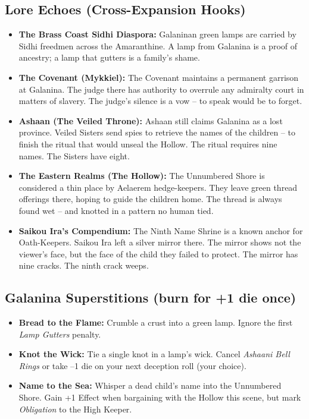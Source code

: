 \subsection*{Lore Echoes (Cross-Expansion Hooks)}
\begin{itemize}
  \item \textbf{The Brass Coast Sidhi Diaspora:} Galaninan green lamps are carried by Sidhi freedmen across the Amaranthine. A lamp from Galanina is a proof of ancestry; a lamp that gutters is a family's shame.
  \item \textbf{The Covenant (Mykkiel):} The Covenant maintains a permanent garrison at Galanina. The judge there has authority to overrule any admiralty court in matters of slavery. The judge's silence is a vow -- to speak would be to forget.
  \item \textbf{Ashaan (The Veiled Throne):} Ashaan still claims Galanina as a lost province. Veiled Sisters send spies to retrieve the names of the children -- to finish the ritual that would unseal the Hollow. The ritual requires nine names. The Sisters have eight.
  \item \textbf{The Eastern Realms (The Hollow):} The Unnumbered Shore is considered a thin place by Aelaerem hedge-keepers. They leave green thread offerings there, hoping to guide the children home. The thread is always found wet -- and knotted in a pattern no human tied.
  \item \textbf{Saikou Ira's Compendium:} The Ninth Name Shrine is a known anchor for Oath-Keepers. Saikou Ira left a silver mirror there. The mirror shows not the viewer's face, but the face of the child they failed to protect. The mirror has nine cracks. The ninth crack weeps.
\end{itemize}

\subsection*{Galanina Superstitions (burn for +1 die once)}
\begin{itemize}
  \item \textbf{Bread to the Flame:} Crumble a crust into a green lamp. Ignore the first \textit{Lamp Gutters} penalty.
  \item \textbf{Knot the Wick:} Tie a single knot in a lamp's wick. Cancel \textit{Ashaani Bell Rings} or take --1 die on your next deception roll (your choice).
  \item \textbf{Name to the Sea:} Whisper a dead child's name into the Unnumbered Shore. Gain +1 Effect when bargaining with the Hollow this scene, but mark \textit{Obligation} to the High Keeper.
\end{itemize}

